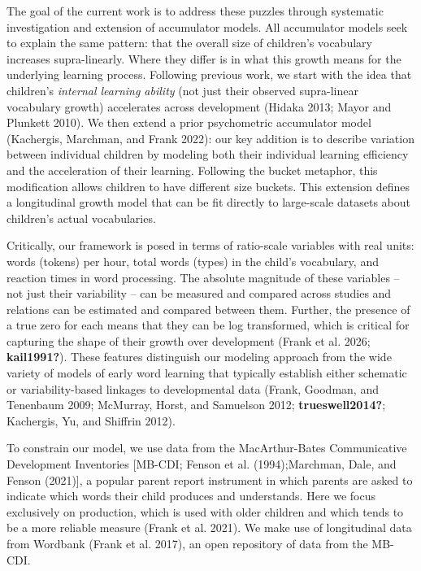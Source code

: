\documentclass[
  11pt,
]{article}
\begin{document}
The goal of the current work is to address these puzzles through
systematic investigation and extension of accumulator models. All
accumulator models seek to explain the same pattern: that the overall
size of children's vocabulary increases supra-linearly. Where they
differ is in what this growth means for the underlying learning process.
Following previous work, we start with the idea that children's
\emph{internal learning ability} (not just their observed supra-linear
vocabulary growth) accelerates across development (Hidaka 2013; Mayor
and Plunkett 2010). We then extend a prior psychometric accumulator
model (Kachergis, Marchman, and Frank 2022): our key addition is to
describe variation between individual children by modeling both their
individual learning efficiency and the acceleration of their learning.
Following the bucket metaphor, this modification allows children to have
different size buckets. This extension defines a longitudinal growth
model that can be fit directly to large-scale datasets about children's
actual vocabularies.

Critically, our framework is posed in terms of ratio-scale variables
with real units: words (tokens) per hour, total words (types) in the
child's vocabulary, and reaction times in word processing. The absolute
magnitude of these variables -- not just their variability -- can be
measured and compared across studies and relations can be estimated and
compared between them. Further, the presence of a true zero for each
means that they can be log transformed, which is critical for capturing
the shape of their growth over development (Frank et al. 2026;
\textbf{kail1991?}). These features distinguish our modeling approach
from the wide variety of models of early word learning that typically
establish either schematic or variability-based linkages to
developmental data (Frank, Goodman, and Tenenbaum 2009; McMurray, Horst,
and Samuelson 2012; \textbf{trueswell2014?}; Kachergis, Yu, and Shiffrin
2012).

To constrain our model, we use data from the MacArthur-Bates
Communicative Development Inventories {[}MB-CDI; Fenson et al.
(1994);Marchman, Dale, and Fenson (2021){]}, a popular parent report
instrument in which parents are asked to indicate which words their
child produces and understands. Here we focus exclusively on production,
which is used with older children and which tends to be a more reliable
measure (Frank et al. 2021). We make use of longitudinal data from
Wordbank (Frank et al. 2017), an open repository of data from the
MB-CDI.
\end{document}
